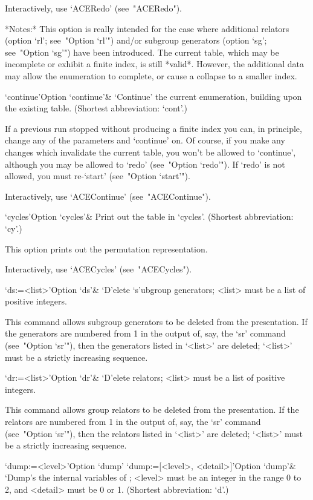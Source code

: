 Interactively, use `ACERedo' (see~"ACERedo").

*Notes:*
This option is really intended for the case where additional  relators
(option `rl'; see~"Option `rl'") and/or  subgroup  generators  (option
`sg'; see~"Option `sg'") have  been  introduced.  The  current  table,
which may be incomplete or exhibit a finite index, is  still  *valid*.
However, the additional data may allow the enumeration to complete, or
cause a collapse to a smaller index.

\>`continue'{Option `continue'}&
`Continue' the current enumeration, building upon the existing table.
(Shortest abbreviation: `cont'.)

If a previous run stopped without producing a finite index you can, in
principle, change any of the parameters and `continue' on. Of  course,
if you make any changes which invalidate the current table, you  won't
be allowed to `continue',  although  you  may  be  allowed  to  `redo'
(see~"Option `redo'"). If `redo' is not allowed, you  must  re-`start'
(see~"Option `start'").

Interactively, use `ACEContinue' (see~"ACEContinue").

\>`cycles'{Option `cycles'}&
Print out the table in `cycles'. (Shortest abbreviation: `cy'.)

This option prints out the permutation representation.

Interactively, use `ACECycles' (see~"ACECycles").

\>`ds:=<list>'{Option `ds'}&
`D'elete `s'ubgroup generators; <list> must  be  a  list  of  positive
integers.

This command  allows  subgroup  generators  to  be  deleted  from  the
presentation. If the generators are numbered from 1 in the output  of,
say, the `sr' command (see~"Option `sr'"), then the generators  listed
in `<list>' are  deleted;  `<list>'  must  be  a  strictly  increasing
sequence.

\>`dr:=<list>'{Option `dr'}&
`D'elete relators; <list> must be a list of positive integers.

This  command  allows  group  relators  to   be   deleted   from   the
presentation. If the relators are numbered from 1 in  the  output  of,
say, the `sr' command (see~"Option `sr'"), then the relators listed in
`<list>' are deleted; `<list>' must be a strictly increasing sequence.

\>`dump:=<level>'{Option `dump'}
\>`dump:=[<level>, <detail>]'{Option `dump'}&
`Dump's the internal variables of {\ACE}; <level> must be  an  integer
in the range 0 to 2, and <detail> must be 0 or 1.
(Shortest abbreviation: `d'.)

